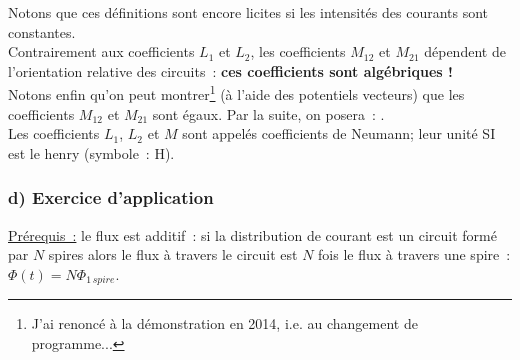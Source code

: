 \documentclass{article}
\begin{document}
Notons que ces définitions sont encore licites si les intensités des
courants sont constantes. \\
Contrairement aux coefficients $L_{1}$ et $L_{2}$, les coefficients
$M_{12}$ et $M_{21}$ dépendent de l'orientation relative des
circuits : \textbf{ces coefficients sont algébriques !} \\
Notons enfin qu'on peut montrer\footnote{J'ai renoncé à la
démonstration en 2014, i.e. au changement de programme...} (à l'aide
des potentiels vecteurs) que les coefficients $M_{12}$ et $M_{21}$
sont égaux. Par la suite,
on posera : . \\
Les coefficients $L_{1}$, $L_{2}$ et $M$ sont appelés coefficients
de Neumann; leur unité SI est le henry (symbole : H).

\subsubsection*{d) Exercice d'application}
\underline{Prérequis :} le flux est additif : si la
distribution de courant est un circuit formé par $N$ spires alors le
flux à travers le circuit est $N$ fois le flux à travers une spire :
$\Phi(t) = N\Phi_{1\,spire}$.
\end{document}
